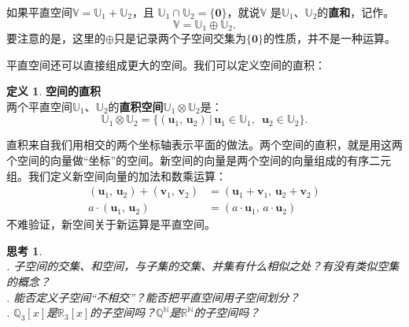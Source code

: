 \documentclass[12pt,UTF8]{ctexbook}
\theoremstyle{definition}
\newtheorem{df}{定义}[section]
\theoremstyle{plain}
\newtheorem{sk}{思考}[section]
\begin{document}
如果平直空间$\mathbb{V} = \mathbb{U}_1 + \mathbb{U}_2$，且
$\mathbb{U}_1 \cap \mathbb{U}_2 = \{\mathbf{0}\}$，就说$\mathbb{V}$
是$\mathbb{U}_1$、$\mathbb{U}_2$的\textbf{直和}，记作。
$$\mathbb{V} = \mathbb{U}_1 \oplus \mathbb{U}_2.$$
要注意的是，这里的$\oplus$只是记录两个子空间交集为$\{\mathbf{0}\}$的性质，并不是一种运算。

平直空间还可以直接组成更大的空间。我们可以定义空间的直积：

\begin{df}{\textbf{空间的直积}}
    \mbox{} \\
    两个平直空间$\mathbb{U}_1$、$\mathbb{U}_2$的\textbf{直积空间}$\mathbb{U}_1 \otimes \mathbb{U}_2$是：
    $$ \mathbb{U}_1 \otimes \mathbb{U}_2 = \{ (\mathbf{u}_1, \, \mathbf{u}_2) \,|\, \mathbf{u}_1 \in \mathbb{U}_1,\,\,\, \mathbf{u}_2 \in \mathbb{U}_2\}.$$
\end{df}

直积来自我们用相交的两个坐标轴表示平面的做法。两个空间的直积，就是用这两个空间的向量做“坐标”的空间。新空间的向量是两个空间的向量组成的有序二元组。我们定义新空间向量的加法和数乘运算：
\begin{align*}
    (\mathbf{u}_1, \, \mathbf{u}_2) + (\mathbf{v}_1, \, \mathbf{v}_2) &= (\mathbf{u}_1 + \mathbf{v}_1, \, \mathbf{u}_2 + \mathbf{v}_2) \\
    a \cdot (\mathbf{u}_1, \, \mathbf{u}_2) &= (a\cdot \mathbf{u}_1, \, a \cdot \mathbf{u}_2) 
\end{align*}
不难验证，新空间关于新运算是平直空间。

\begin{sk}
    \mbox{} \\
    . 子空间的交集、和空间，与子集的交集、并集有什么相似之处？有没有类似空集的概念？\\
    . 能否定义子空间“不相交”？能否把平直空间用子空间划分？\\
    . $\mathbb{Q}_3[x]$是$\mathbb{R}_3[x]$的子空间吗？$\mathbb{Q}^\mathbb{N}$是$\mathbb{R}^\mathbb{N}$的子空间吗？
\end{sk}
\end{document}
